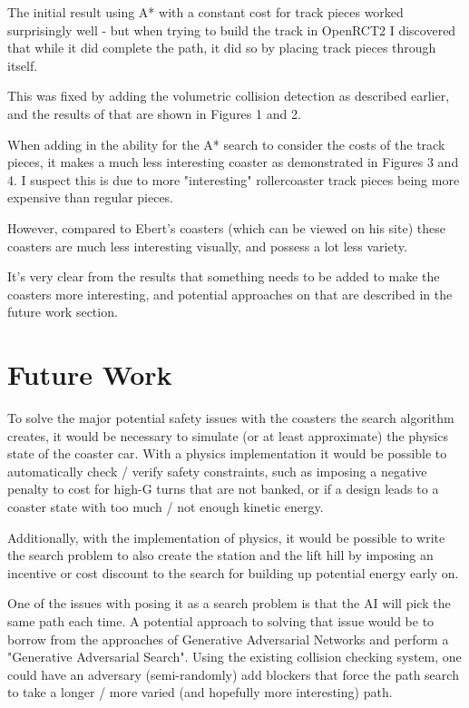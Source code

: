 \documentclass[12pt]{article}
\begin{document}
The initial result using A* with a constant cost for track pieces worked surprisingly well - but when trying to build the track in OpenRCT2 I discovered that while it did complete the path, it did so by placing track pieces through itself.

This was fixed by adding the volumetric collision detection as described earlier, and the results of that are shown in Figures 1 and 2.

When adding in the ability for the A* search to consider the costs of the track pieces, it makes a much less interesting coaster as demonstrated in Figures 3 and 4.
I suspect this is due to more "interesting" rollercoaster track pieces being more expensive than regular pieces.

However, compared to Ebert's coasters (which can be viewed on his site) these coasters are much less interesting visually, and possess a lot less variety.

It's very clear from the results that something needs to be added to make the coasters more interesting, and potential approaches on that are described in the future work section.

\section*{Future Work}
To solve the major potential safety issues with the coasters the search algorithm creates, it would be necessary to simulate (or at least approximate) the physics state of the coaster car.
With a physics implementation it would be possible to automatically check / verify safety constraints, such as imposing a negative penalty to cost for high-G turns that are not banked, or if a design leads to a coaster state with too much / not enough kinetic energy.

Additionally, with the implementation of physics, it would be possible to write the search problem to also create the station and the lift hill by imposing an incentive or cost discount to the search for building up potential energy early on.

One of the issues with posing it as a search problem is that the AI will pick the same path each time.
A potential approach to solving that issue would be to borrow from the approaches of Generative Adversarial Networks and perform a "Generative Adversarial Search".
Using the existing collision checking system, one could have an adversary (semi-randomly) add blockers that force the path search to take a longer / more varied (and hopefully more interesting) path.
\end{document}
